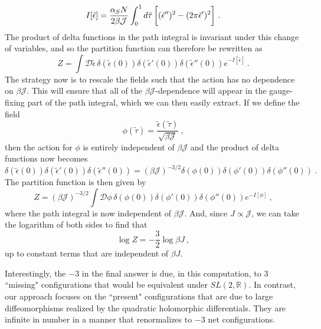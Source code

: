 \documentclass[12pt]{article}
\begin{document}
\begin{equation}
	I[\tilde{\epsilon}] = \frac{\alpha_S N}{2 \beta \mathcal{J}} \int_0^1 d \tilde{\tau}\,\bigg{[}(\tilde{\epsilon}'')^2 - (2\pi \tilde{\epsilon}')^2 \bigg{]}~.
\end{equation}
The product of delta functions in the path integral is invariant under this change of variables, and so the partition function can therefore be rewritten as
\begin{equation}
	Z = \int \mathcal{D} \tilde{\epsilon}\, \delta(\tilde{\epsilon}(0))\delta(\tilde{\epsilon}'(0))\delta(\tilde{\epsilon}''(0)) e^{-I[\tilde{\epsilon}]}~.
\end{equation}
The strategy now is to rescale the fields such that the action has no dependence on $\beta \mathcal{J}$.  This will ensure that all of the $\beta\mathcal{J}$-dependence will appear in the gauge-fixing part of the path integral, which we can then easily extract.  If we define the field
\begin{equation}
	\phi(\tilde{\tau}) = \frac{\tilde{\epsilon}(\tilde{\tau})}{\sqrt{\beta \mathcal{J}}}~,
\end{equation}
then the action for $\phi$ is entirely independent of $\beta \mathcal{J}$ and the product of delta functions now becomes
\begin{equation}
	\delta(\tilde{\epsilon}(0))\delta(\tilde{\epsilon}'(0))\delta(\tilde{\epsilon}''(0)) = (\beta \mathcal{J})^{-3/2}\delta(\phi(0))\delta(\phi'(0))\delta(\phi''(0))~.
\end{equation}
The partition function is then given by
\begin{equation}
	Z = (\beta \mathcal{J})^{-3/2}\int \mathcal{D}\phi\,\delta(\phi(0))\delta(\phi'(0))\delta(\phi''(0)) e^{-I[\phi]}~,
\end{equation}
where the path integral is now independent of $\beta \mathcal{J}$.  And, since $J \propto \mathcal{J}$, we can take the logarithm of both sides to find that
\begin{equation}
	\log Z = -\frac{3}{2}\log \beta J~,
\end{equation}
up to constant terms that are independent of $\beta J$.  

Interestingly, the $-3$ in the final answer is due, in this computation, to $3$ ``missing" configurations that would be equivalent under $SL(2,\mathbb{R})$.  In contrast, our approach focuses on the ``present" configurations that are due to large diffeomorphisms realized by the quadratic holomorphic differentials. They are infinite in number in a manner that renormalizes to $-3$ net configurations. 
\end{document}
